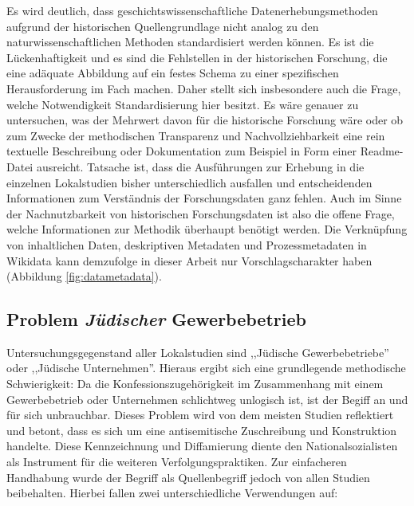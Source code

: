 Es wird deutlich, dass geschichtswissenschaftliche Datenerhebungsmethoden aufgrund der historischen Quellengrundlage nicht analog zu den naturwissenschaftlichen Methoden standardisiert werden können. Es ist die Lückenhaftigkeit und es sind die Fehlstellen in der historischen Forschung, die eine adäquate Abbildung auf ein festes Schema zu einer spezifischen Herausforderung im Fach machen. Daher stellt sich insbesondere auch die Frage, welche Notwendigkeit Standardisierung hier besitzt. Es wäre genauer zu untersuchen, was der Mehrwert davon für die historische Forschung wäre oder ob zum Zwecke der methodischen Transparenz und Nachvollziehbarkeit eine rein textuelle Beschreibung oder Dokumentation zum Beispiel in Form einer Readme-Datei ausreicht. Tatsache ist, dass die Ausführungen zur Erhebung in die einzelnen Lokalstudien bisher unterschiedlich ausfallen und entscheidenden Informationen zum Verständnis der Forschungsdaten ganz fehlen. Auch im Sinne der Nachnutzbarkeit von historischen Forschungsdaten ist also die offene Frage, welche Informationen zur Methodik überhaupt benötigt werden. Die Verknüpfung von inhaltlichen Daten, deskriptiven Metadaten und Prozessmetadaten in Wikidata kann demzufolge in dieser Arbeit nur Vorschlagscharakter haben (Abbildung \ref{fig:datametadata}).

\subsection{Problem \textit{Jüdischer} Gewerbebetrieb}

Untersuchungsgegenstand aller Lokalstudien sind ,,Jüdische Gewerbebetriebe'' oder ,,Jüdische Unternehmen''. Hieraus ergibt sich eine grundlegende methodische Schwierigkeit: Da die Konfessionszugehörigkeit im Zusammenhang mit einem Gewerbebetrieb oder Unternehmen schlichtweg unlogisch ist, ist der Begiff an und für sich unbrauchbar. Dieses Problem wird von dem meisten Studien reflektiert und betont, dass es sich um eine antisemitische Zuschreibung und Konstruktion handelte. Diese Kennzeichnung und Diffamierung diente den Nationalsozialisten als Instrument für die weiteren Verfolgungspraktiken. Zur einfacheren Handhabung wurde der Begriff als Quellenbegriff jedoch von allen Studien beibehalten. Hierbei fallen zwei unterschiedliche Verwendungen auf: 

